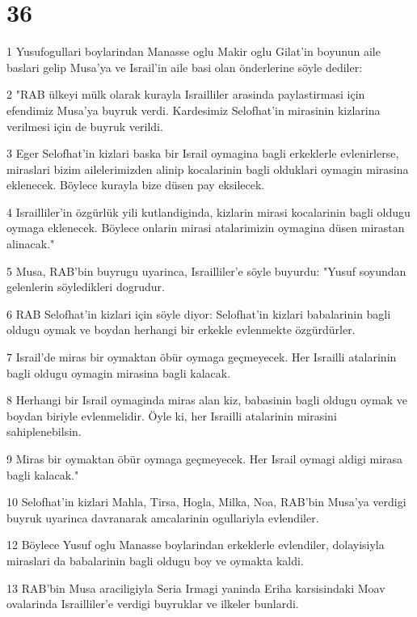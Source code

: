\chapter{36}

\par 1 Yusufogullari boylarindan Manasse oglu Makir oglu Gilat'in boyunun aile baslari gelip Musa'ya ve Israil'in aile basi olan önderlerine söyle dediler:
\par 2 "RAB ülkeyi mülk olarak kurayla Israilliler arasinda paylastirmasi için efendimiz Musa'ya buyruk verdi. Kardesimiz Selofhat'in mirasinin kizlarina verilmesi için de buyruk verildi.
\par 3 Eger Selofhat'in kizlari baska bir Israil oymagina bagli erkeklerle evlenirlerse, miraslari bizim ailelerimizden alinip kocalarinin bagli olduklari oymagin mirasina eklenecek. Böylece kurayla bize düsen pay eksilecek.
\par 4 Israilliler'in özgürlük yili kutlandiginda, kizlarin mirasi kocalarinin bagli oldugu oymaga eklenecek. Böylece onlarin mirasi atalarimizin oymagina düsen mirastan alinacak."
\par 5 Musa, RAB'bin buyrugu uyarinca, Israilliler'e söyle buyurdu: "Yusuf soyundan gelenlerin söyledikleri dogrudur.
\par 6 RAB Selofhat'in kizlari için söyle diyor: Selofhat'in kizlari babalarinin bagli oldugu oymak ve boydan herhangi bir erkekle evlenmekte özgürdürler.
\par 7 Israil'de miras bir oymaktan öbür oymaga geçmeyecek. Her Israilli atalarinin bagli oldugu oymagin mirasina bagli kalacak.
\par 8 Herhangi bir Israil oymaginda miras alan kiz, babasinin bagli oldugu oymak ve boydan biriyle evlenmelidir. Öyle ki, her Israilli atalarinin mirasini sahiplenebilsin.
\par 9 Miras bir oymaktan öbür oymaga geçmeyecek. Her Israil oymagi aldigi mirasa bagli kalacak."
\par 10 Selofhat'in kizlari Mahla, Tirsa, Hogla, Milka, Noa, RAB'bin Musa'ya verdigi buyruk uyarinca davranarak amcalarinin ogullariyla evlendiler.
\par 12 Böylece Yusuf oglu Manasse boylarindan erkeklerle evlendiler, dolayisiyla miraslari da babalarinin bagli oldugu boy ve oymakta kaldi.
\par 13 RAB'bin Musa araciligiyla Seria Irmagi yaninda Eriha karsisindaki Moav ovalarinda Israilliler'e verdigi buyruklar ve ilkeler bunlardi.


